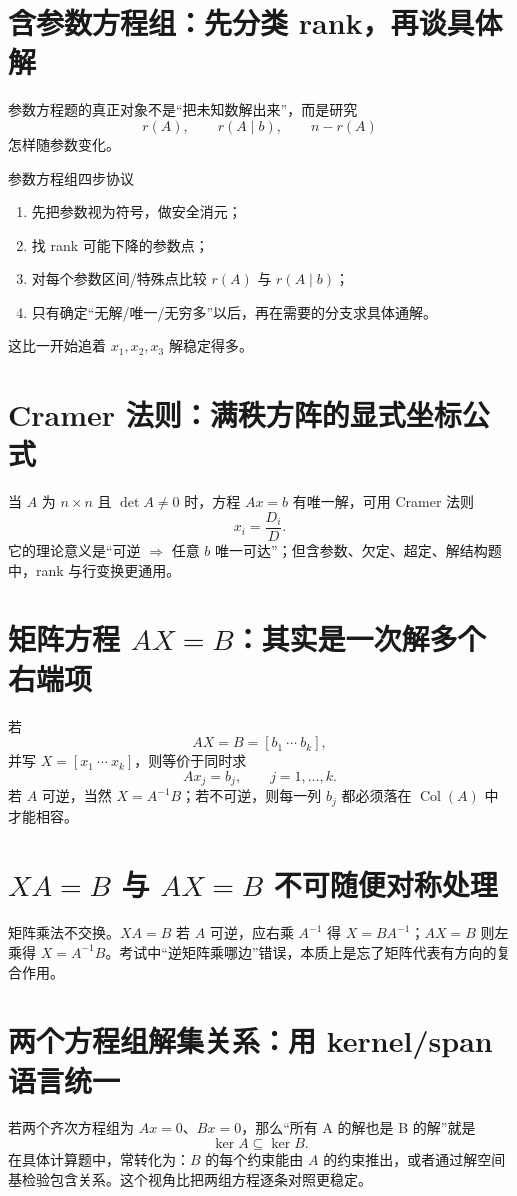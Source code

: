 \documentclass[11pt,a4paper,openany]{ctexbook}
\begin{document}
\section{含参数方程组：先分类 rank，再谈具体解}
参数方程题的真正对象不是“把未知数解出来”，而是研究
\[
r(A),\qquad r(A\mid b),\qquad n-r(A)
\]
怎样随参数变化。

\begin{methodbox}{参数方程组四步协议}
\begin{enumerate}
  \item 先把参数视为符号，做安全消元；
  \item 找 rank 可能下降的参数点；
  \item 对每个参数区间/特殊点比较 $r(A)$ 与 $r(A\mid b)$；
  \item 只有确定“无解/唯一/无穷多”以后，再在需要的分支求具体通解。
\end{enumerate}
这比一开始追着 $x_1,x_2,x_3$ 解稳定得多。
\end{methodbox}

\section{Cramer 法则：满秩方阵的显式坐标公式}
当 $A$ 为 $n\times n$ 且 $\det A\neq0$ 时，方程 $Ax=b$ 有唯一解，可用 Cramer 法则
\[
x_i=\frac{D_i}{D}.
\]
它的理论意义是“可逆 $\Rightarrow$ 任意 $b$ 唯一可达”；但含参数、欠定、超定、解结构题中，rank 与行变换更通用。

\section{矩阵方程 \texorpdfstring{$AX=B$}{AX=B}：其实是一次解多个右端项}
若
\[
AX=B=[b_1\ \cdots\ b_k],
\]
并写 $X=[x_1\ \cdots\ x_k]$，则等价于同时求
\[
Ax_j=b_j,\qquad j=1,\dots,k.
\]
若 $A$ 可逆，当然 $X=A^{-1}B$；若不可逆，则每一列 $b_j$ 都必须落在 $\operatorname{Col}(A)$ 中才能相容。

\section{\texorpdfstring{$XA=B$ 与 $AX=B$}{XA=B 与 AX=B} 不可随便对称处理}
矩阵乘法不交换。$XA=B$ 若 $A$ 可逆，应右乘 $A^{-1}$ 得 $X=BA^{-1}$；$AX=B$ 则左乘得 $X=A^{-1}B$。考试中“逆矩阵乘哪边”错误，本质上是忘了矩阵代表有方向的复合作用。

\section{两个方程组解集关系：用 kernel/span 语言统一}
若两个齐次方程组为 $Ax=0$、$Bx=0$，那么“所有 A 的解也是 B 的解”就是
\[
\ker A\subseteq\ker B.
\]
在具体计算题中，常转化为：$B$ 的每个约束能由 $A$ 的约束推出，或者通过解空间基检验包含关系。这个视角比把两组方程逐条对照更稳定。
\end{document}
